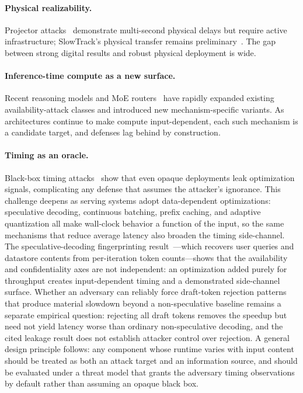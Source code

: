 \documentclass[acmsmall,screen,review,nonacm]{acmart}
\begin{document}
\paragraph{Physical realizability.} Projector attacks~\cite{ma2024slowperception,muller2025detstorm} demonstrate multi-second physical delays but require active infrastructure; SlowTrack's physical transfer remains preliminary~\cite{ma2024slowtrack}. The gap between strong digital results and robust physical deployment is wide.

\paragraph{Inference-time compute as a new surface.} Recent reasoning models and MoE routers~\cite{liu2026reasoningbomb,li2026thinktrap,fei2026misrouter} have rapidly expanded existing availability-attack classes and introduced new mechanism-specific variants. As architectures continue to make compute input-dependent, each such mechanism is a candidate target, and defenses lag behind by construction.

\paragraph{Timing as an oracle.} Black-box timing attacks~\cite{nakai2021timing} show that even opaque deployments leak optimization signals, complicating any defense that assumes the attacker's ignorance. This challenge deepens as serving systems adopt data-dependent optimizations: speculative decoding, continuous batching, prefix caching, and adaptive quantization all make wall-clock behavior a function of the input, so the same mechanisms that reduce average latency also broaden the timing side-channel. The speculative-decoding fingerprinting result~\cite{sun2024speculative}---which recovers user queries and datastore contents from per-iteration token counts---shows that the availability and confidentiality axes are not independent: an optimization added purely for throughput creates input-dependent timing and a demonstrated side-channel surface. Whether an adversary can reliably force draft-token rejection patterns that produce material slowdown beyond a non-speculative baseline remains a separate empirical question: rejecting all draft tokens removes the speedup but need not yield latency worse than ordinary non-speculative decoding, and the cited leakage result does not establish attacker control over rejection. A general design principle follows: any component whose runtime varies with input content should be treated as both an attack target and an information source, and should be evaluated under a threat model that grants the adversary timing observations by default rather than assuming an opaque black box.
\end{document}
